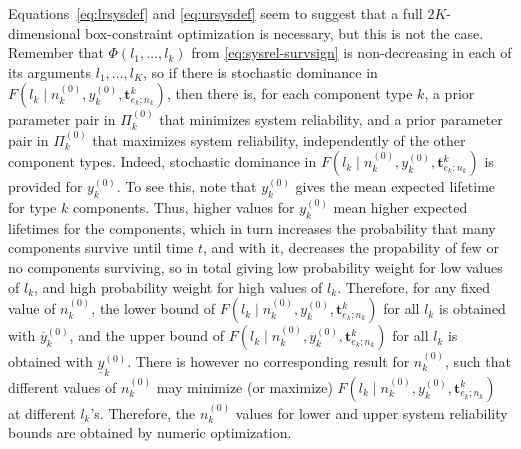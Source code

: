 \documentclass[Journal,letterpaper]{ascelike-new}
\newcommand{\mbf}[1]{\mathbf{#1}}
\renewcommand{\vec}[1]{{\bm#1}}
\newcommand{\uz}{^{(0)}} %
\newcommand{\ul}[1]{\underline{#1}}
\newcommand{\ol}[1]{\overline{#1}}
\def\Tsys{T_\text{sys}}
\def\ykz{y\uz_k}
\def\ykzl{\ul{y}\uz_k}
\def\ykzu{\ol{y}\uz_k}
\def\nkz{n\uz_k}
\def\PkZ{\Pi\uz_k}
\begin{document}
Equations~\eqref{eq:lrsysdef} and \eqref{eq:ursysdef} seem to suggest that
a full $2K$-dimensional box-constraint optimization is necessary,
but this is not the case.
Remember that $\Phi(l_1,\ldots,l_k)$ from \eqref{eq:sysrel-survsign} is non-decreasing in each of its arguments $l_1,\ldots,l_K$,
so if there is stochastic dominance in $F(l_k \mid \nkz,\ykz,\vec{t}^k_{e_k;n_k})$,
then there is, for each component type $k$,
a prior parameter pair in $\PkZ$ that minimizes system reliability, and
a prior parameter pair in $\PkZ$ that maximizes system reliability,
independently of the other component types. 
Indeed, stochastic dominance in $F(l_k \mid \nkz,\ykz,\vec{t}^k_{e_k;n_k})$ is provided for $\ykz$.
To see this, note that $\ykz$ gives the mean expected lifetime for type $k$ components.
Thus, higher values for $\ykz$ mean higher expected lifetimes for the components,
which in turn increases the probability that many components survive until time $t$,
and with it, decreases the propability of few or no components surviving,
so in total giving low probability weight for low values of $l_k$,
and high probability weight for high values of $l_k$. 
Therefore, for any fixed value of $\nkz$, 
the lower bound of $F(l_k \mid \nkz,\ykz,\vec{t}^k_{e_k;n_k})$ for all $l_k$ is obtained with $\ykzu$, and
the upper bound of $F(l_k \mid \nkz,\ykz,\vec{t}^k_{e_k;n_k})$ for all $l_k$ is obtained with $\ykzl$.
There is however no corresponding result for $\nkz$,
such that different values of $\nkz$ may minimize (or maximize) $F(l_k \mid \nkz,\ykz,\vec{t}^k_{e_k;n_k})$ at different $l_k$'s.
Therefore, the $\nkz$ values for lower and upper system reliability bounds are obtained by numeric optimization.
%
\iffalse %
\begin{linenomath*}
\begin{align} \label{eq:25}
\lefteqn{%
P(\Tsys > t\mid\{\nkz,\ykz, \mbf{t}^k_{e_k;n_k}\}_{k=1}^K)} \hspace*{10ex}\nonumber\\ 
 &= \sum_{l_1=0}^{n_1-e_1} \cdots \sum_{l_K=0}^{n_K-e_K} \Phi(l_1,\ldots,l_K) \prod_{k=1}^K
    P(C^k_t = l_k\mid\nkz,\ykz, \vec{t}^k_{e_k;n_k})
\end{align}
\end{linenomath*}
we cannot simply plug in all the $\ul{P}(C^k_t = l_k\mid \ldots)$ %
to get $\ul{P}(\Tsys > t\mid\nkz,\ykz, \mbf{t}^k_{e_k;n_k})$, %
as the $\ul{P}(C^k_t = l_k\mid \ldots)$ could correspond to different $(\nkz,\ykz)$ for each $l_k$.
(It would give us a lower bound for $\ul{P}(\Tsys > t\mid\ldots)$, however, but it might be very coarse.)
%
While it is clear that the lower bounds for $\ykz$ will lead to the lower system survival function,
the role of $\nkz$ is not so clear.
We therefore resort to numerical optimization of \eqref{eq:25} over $\{\nkz, k=1,\ldots,K\}$
to obtain the lower bound for $P(\Tsys > t\mid\{\nkz,\ykz, \mbf{t}^k_{e_k;n_k}\}_{k=1}^K)$.
\fi %
\end{document}
